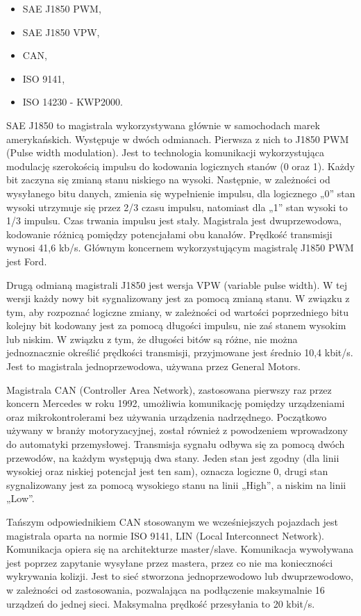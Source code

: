 \documentclass[12pt, twoside]{article} %
\numberwithin{equation}{subsection}
\numberwithin{figure}{section}
\numberwithin{table}{section}
\begin{document}
		\begin{itemize}
			\item{SAE J1850 PWM,}
			\item{SAE J1850 VPW,}
			\item{CAN,}
			\item{ISO 9141,}
			\item{ISO 14230 - KWP2000.}
		\end{itemize}
		
		SAE  J1850 to  magistrala wykorzystywana głównie w samochodach marek amerykańskich. Występuje w dwóch odmianach. Pierwsza z nich to J1850 PWM (Pulse width modulation). Jest to technologia komunikacji wykorzystująca modulację szerokością impulsu do kodowania logicznych stanów (0 oraz 1). Każdy bit zaczyna się zmianą stanu niskiego na wysoki. Następnie, w zależności od wysyłanego bitu danych, zmienia się wypełnienie impulsu, dla logicznego „0” stan wysoki utrzymuje się przez 2/3 czasu impulsu, natomiast dla „1” stan wysoki to 1/3 impulsu. Czas trwania impulsu jest stały. Magistrala jest dwuprzewodowa, kodowanie różnicą pomiędzy potencjałami obu kanałów. Prędkość transmisji wynosi 41,6 kb/s. Głównym koncernem wykorzystującym magistralę J1850 PWM jest Ford.
		
		\newpage
		
		Drugą odmianą magistrali J1850 jest wersja VPW (variable pulse width). W tej wersji każdy nowy bit sygnalizowany jest za pomocą zmianą stanu. W związku z tym, aby rozpoznać logiczne zmiany, w zależności od wartości poprzedniego bitu kolejny bit kodowany jest za pomocą długości impulsu, nie zaś stanem wysokim lub niskim.  W związku z tym, że długości bitów są różne,  nie można jednoznacznie określić prędkości transmisji, przyjmowane jest średnio 10,4 kbit/s. Jest to magistrala jednoprzewodowa, używana przez General Motors.
		
		Magistrala CAN (Controller Area Network), zastosowana pierwszy raz przez koncern Mercedes w roku 1992,  umożliwia komunikację pomiędzy urządzeniami oraz mikrokontrolerami bez używania urządzenia nadrzędnego.  Początkowo używany w branży motoryzacyjnej, został również z powodzeniem wprowadzony do automatyki przemysłowej. Transmisja sygnału odbywa się za pomocą dwóch przewodów, na każdym występują dwa stany. Jeden stan jest zgodny (dla linii wysokiej oraz niskiej potencjał jest ten sam), oznacza logiczne 0, drugi stan sygnalizowany jest za pomocą wysokiego stanu na linii „High”, a niskim na linii „Low”. 
		
		Tańszym odpowiednikiem CAN stosowanym we wcześniejszych pojazdach jest magistrala oparta na normie ISO 9141,  LIN (Local Interconnect Network).  Komunikacja opiera się na architekturze master/slave. Komunikacja wywoływana jest poprzez zapytanie wysyłane przez mastera, przez co nie ma konieczności wykrywania kolizji. Jest to sieć stworzona jednoprzewodowo lub dwuprzewodowo, w zależności od zastosowania, pozwalająca na podłączenie maksymalnie 16 urządzeń do jednej sieci. Maksymalna prędkość przesyłania to 20 kbit/s.
		
\end{document}
